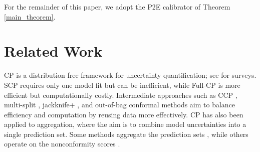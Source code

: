 \documentclass{article}
\theoremstyle{plain}
\theoremstyle{definition}
\theoremstyle{remark}
\begin{document}
For the remainder of this paper, we adopt the P2E calibrator of Theorem \ref{main_theorem}.





\section{Related Work}

CP \citep{saunders1999transduction,vovk2005algorithmic} is a distribution-free framework for uncertainty quantification; see \citet{Fontana_2023,angelopoulos2023conformal} for surveys. SCP \citep{papadopoulos2002inductive,lei2018distribution} requires only one model fit but can be inefficient, while Full-CP \citep{vovk2005algorithmic} is more efficient but computationally costly. Intermediate approaches such as CCP \citep{vovk2015cross,vovk2018cross}, multi-split \citep{solari2022multi}, jackknife+ \citep{barber2021jacknife}, and out-of-bag conformal methods \citep{gupta2022nested} aim to balance efficiency and computation by reusing data more effectively. CP has also been applied to aggregation, where the aim is to combine model uncertainties into a single prediction set. Some methods aggregate the prediction sets \citep{yang2024selectionaggregationconformalprediction,gasparin2024merginguncertaintysetsmajority}, while others operate on the nonconformity scores \citep{luo2025weightedaggregationconformityscores,rivera2025conformalpredictionensemblesimproving,SACP}.
\end{document}
